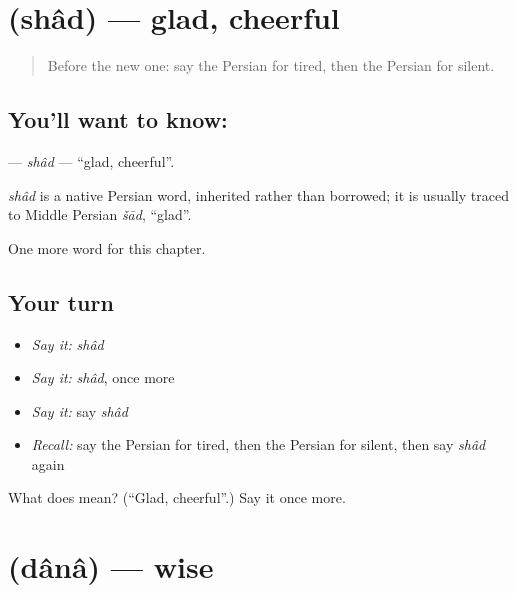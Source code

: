 \section[\texorpdfstring{\fa{شاد} (shâd)}{شاد (shâd)}]{ (shâd) — glad, cheerful}

\label{lesson:FA-C129-shad}



\begin{quote}
Before the new one: say the Persian for tired, then the Persian for silent.
\end{quote}

\subsection*{You'll want to know: }
\textbf{} — \emph{shâd} — \textquotedblleft{}glad, cheerful\textquotedblright{}.

\begin{cousinweb}
\emph{shâd} is a native Persian word, inherited rather than borrowed; it is usually traced to Middle Persian \emph{šād}, \textquotedblleft{}glad\textquotedblright{}.
\end{cousinweb}

\begin{grammarlens}[title={What you've built}]
One more word for this chapter.
\end{grammarlens}

\subsection*{Your turn}
\begin{itemize}
\raggedright
  \item \emph{Say it:} \emph{shâd}
  \item \emph{Say it:} \emph{shâd}, once more
  \item \emph{Say it:} say \emph{shâd}
  \item \emph{Recall:} say the Persian for tired, then the Persian for silent, then say \emph{shâd} again
\end{itemize}

\begin{tcolorbox}[breakable,colback=teal!4,colframe=teal!35!black,title={Before you move on}]
What does  mean? (\textquotedblleft{}Glad, cheerful\textquotedblright{}.) Say it once more.
\end{tcolorbox}
\section[\texorpdfstring{\fa{دانا} (dânâ)}{دانا (dânâ)}]{ (dânâ) — wise}

